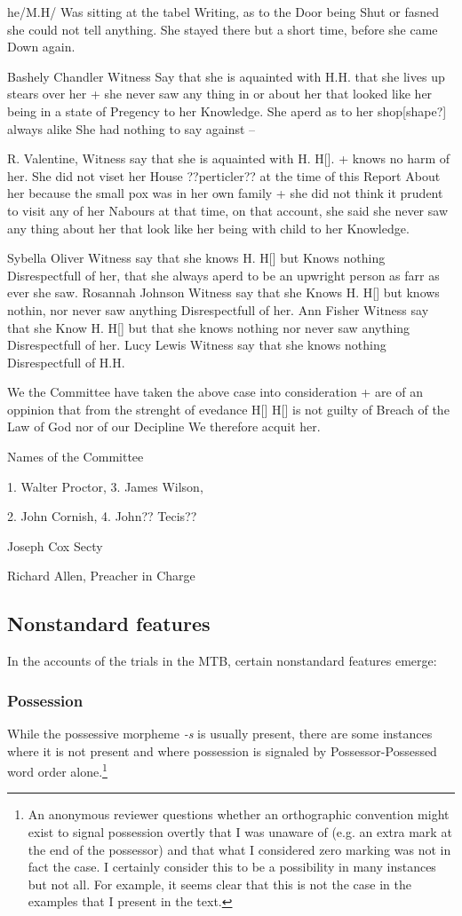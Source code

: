 \documentclass[output=paper,colorlinks,citecolor=brown]{langscibook}
\begin{document}
he/M.H/ Was sitting at the tabel Writing, as to the Door being Shut or fasned she could not tell anything. She stayed there but a short time, before she came Down again. 

Bashely Chandler Witness Say that she is aquainted with H.H. that she lives up stears over her + she never saw any thing in or about her that looked like her being in a state of Pregency to her Knowledge. She aperd as to her shop[shape?] always alike She had nothing to say against -- 

R. Valentine, Witness say that she is aquainted with H. H[]. + knows no harm of her. She did not viset her House ??perticler?? at the time of this Report About her because the small pox was in her own family + she did not think it prudent to visit any of her Nabours at that time, on that account, she said she never saw any thing about her that look like her being with child to her Knowledge.

Sybella Oliver Witness say that she knows H. H[] but Knows nothing Disrespectfull of her, that she always aperd to be an upwright person as farr as ever she saw. Rosannah Johnson Witness say that she Knows H. H[] but knows nothin, nor never saw anything Disrespectfull of her. Ann Fisher Witness say that she Know H. H[] but that she knows nothing nor never saw anything Disrespectfull of her. Lucy Lewis Witness say that she knows nothing Disrespectfull of H.H. 

We the Committee have taken the above case into consideration + are of an oppinion that from the strenght of evedance H[] H[] is not guilty of Breach of the Law of God nor of our Decipline We therefore acquit her.

Names of the Committee

1. Walter Proctor, 3. James Wilson,

2. John Cornish, 4. John?? Tecis??

Joseph Cox Secty

Richard Allen, Preacher in Charge
\z

\subsection{Nonstandard features}
In the accounts of the trials in the MTB, certain nonstandard features emerge:

\subsubsection{Possession}
While the possessive morpheme \textit{{}-s} is usually present, there are some instances where it is not present and where possession is signaled by Possessor-Possessed word order alone.\footnote{An anonymous reviewer questions whether an orthographic convention might exist to signal possession overtly that I was unaware of (e.g. an extra mark at the end of the possessor) and that what I considered zero marking was not in fact the case. I certainly consider this to be a possibility in many instances but not all. For example, it seems clear that this is not the case in the examples that I present in the text.}
\end{document}
